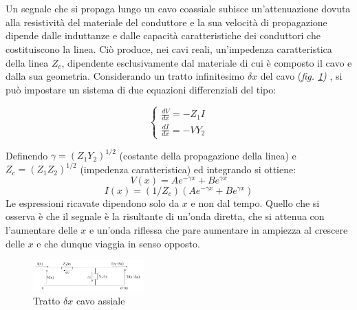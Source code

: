 \documentclass[journal]{IEEEtran}
\begin{document}
\section{} %

Un segnale che si propaga lungo un cavo coassiale subisce un'attenuazione dovuta alla resistività del materiale del conduttore e la sua velocità di propagazione dipende dalle induttanze e dalle capacità caratteristiche dei conduttori che costituiscono la linea. Ciò produce, nei cavi reali, un'impedenza caratteristica della linea $Z_c$, dipendente esclusivamente dal materiale di cui è composto il cavo e dalla sua geometria.
Considerando un tratto infinitesimo $\delta x$ del cavo (\textit{fig. \ref{fig:coassiale}) }, si può impostare un sistema di due equazioni differenziali del tipo:


\begin{equation}
    \begin{cases}
  \frac{dV}{dx} = -Z_1 I \\
  \frac{dI}{dx} = -V Y_2 
\end{cases} 
\end{equation}

Definendo $\gamma = (Z_1 Y_2)^{1/2}$ (costante della propagazione della linea) e $Z_c = (Z_1 Z_2)^{1/2}$ (impedenza caratteristica) ed integrando si ottiene:
 \begin{equation}
     V(x) = Ae^{-\gamma x} + Be^{\gamma x}
 \end{equation}
 \begin{equation}
     I(x) = (1/Z_c)(Ae^{-\gamma x} + Be^{\gamma x}) 
 \end{equation}
Le espressioni ricavate dipendono solo da $x$ e non dal tempo. 
Quello che si osserva è che il segnale è la risultante di un'onda diretta, che si attenua con l'aumentare delle $x$ e un'onda riflessa che pare aumentare in ampiezza al crescere delle $x$ e che dunque viaggia in senso opposto.

\begin{figure}[H]%
\begin {center}
\includegraphics[width=0.38\textwidth]{analysis/output/cavo coassiale.png}
\caption{Tratto $\delta x$ cavo assiale}
\label{fig:coassiale}
\end {center}
\end{figure}
\end{document}
